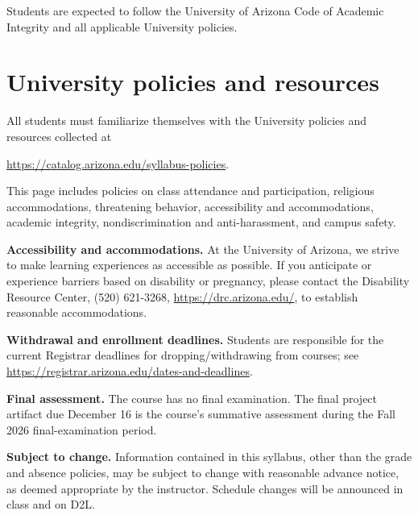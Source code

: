 \documentclass[11pt]{article}
\begin{document}
Students are expected to follow the University of Arizona Code of Academic Integrity and all applicable University policies.

\section*{University policies and resources}

All students must familiarize themselves with the University policies and resources collected at
\begin{center}
\url{https://catalog.arizona.edu/syllabus-policies}.
\end{center}
This page includes policies on class attendance and participation, religious accommodations, threatening behavior, accessibility and accommodations, academic integrity, nondiscrimination and anti-harassment, and campus safety.

\textbf{Accessibility and accommodations.} At the University of Arizona, we strive to make learning experiences as accessible as possible. If you anticipate or experience barriers based on disability or pregnancy, please contact the Disability Resource Center, (520) 621-3268, \url{https://drc.arizona.edu/}, to establish reasonable accommodations.

\textbf{Withdrawal and enrollment deadlines.} Students are responsible for the current Registrar deadlines for dropping/withdrawing from courses; see \url{https://registrar.arizona.edu/dates-and-deadlines}.

\textbf{Final assessment.} The course has no final examination. The final project artifact due December 16 is the course's summative assessment during the Fall 2026 final-examination period.

\textbf{Subject to change.} Information contained in this syllabus, other than the grade and absence policies, may be subject to change with reasonable advance notice, as deemed appropriate by the instructor. Schedule changes will be announced in class and on D2L.
\end{document}
